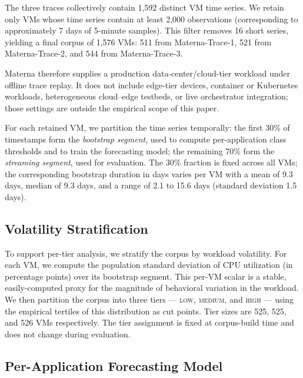 \documentclass[manuscript,screen,review,anonymous]{acmart}
\begin{document}
The three traces collectively contain 1{,}592 distinct VM time
series. We retain only VMs whose time series contain at least
2{,}000 observations (corresponding to approximately 7 days of
5-minute samples). This filter removes 16 short series, yielding
a final corpus of 1{,}576 VMs: 511 from Materna-Trace-1, 521 from
Materna-Trace-2, and 544 from Materna-Trace-3.

Materna therefore supplies a production data-center/cloud-tier
workload under offline trace replay. It does not include edge-tier
devices, container or Kubernetes workloads, heterogeneous
cloud--edge testbeds, or live orchestrator integration; those
settings are outside the empirical scope of this paper.

For each retained VM, we partition the time series temporally:
the first 30\% of timestamps form the \emph{bootstrap segment},
used to compute per-application class thresholds and to train
the forecasting model; the remaining 70\% form the \emph{streaming
segment}, used for evaluation. The 30\% fraction is fixed across
all VMs; the corresponding bootstrap duration in days varies per
VM with a mean of 9.3 days, median of 9.3 days, and a range of
2.1 to 15.6 days (standard deviation 1.5 days).

\subsection{Volatility Stratification}\label{sec:setup-volatility}

To support per-tier analysis, we stratify the corpus by workload
volatility. For each VM, we compute the population standard
deviation of CPU utilization (in percentage points) over its
bootstrap segment. This per-VM scalar is a stable, easily-computed
proxy for the magnitude of behavioral variation in the workload.
We then partition the corpus into three tiers --- \textsc{low},
\textsc{medium}, and \textsc{high} --- using the empirical
tertiles of this distribution as cut points. Tier sizes are
525, 525, and 526 VMs respectively. The tier assignment is fixed
at corpus-build time and does not change during evaluation.

\subsection{Per-Application Forecasting Model}\label{sec:setup-forecaster}
\end{document}
